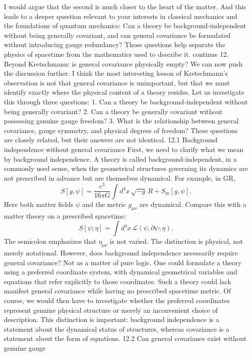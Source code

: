 I would argue that the second is much closer to the heart of the matter. And
this leads to a deeper question relevant to your interests in classical
mechanics and the foundations of quantum mechanics: Can a theory be
background-independent without being generally covariant, and can general
covariance be formulated without introducing gauge redundancy? Those questions
help separate the physics of spacetime from the mathematics used to describe
it. continue 12. Beyond Kretschmann: is general covariance physically empty? We
can now push the discussion further. I think the most interesting lesson of
Kretschmann's observation is not that general covariance is unimportant, but
that we must identify exactly where the physical content of a theory resides.
Let us investigate this through three questions: 1. Can a theory be
background-independent without being generally covariant? 2. Can a theory be
generally covariant without possessing genuine gauge freedom? 3. What is the
relationship between general covariance, gauge symmetry, and physical degrees
of freedom? These questions are closely related, but their answers are not
identical. 12.1 Background independence without general covariance First, we
need to clarify what we mean by background independence. A theory is called
background-independent, in a commonly used sense, when the geometrical
structures governing its dynamics are not prescribed in advance but are
themselves dynamical. For example, in GR, \[ S[g,\psi]= \frac{c^3}{16\pi G}
\int d^4x\,\sqrt{-g}\,R +S_{\mathrm m}[g,\psi]. \] Here both matter fields
\(\psi\) and the metric \(g_{\mu\nu}\) are dynamical. Compare this with a
matter theory on a prescribed spacetime: \[ S[\psi;\eta]= \int d^4x\,\mathcal
L(\psi,\partial\psi;\eta). \] The semicolon emphasizes that \(\eta_{\mu\nu}\)
is not varied. The distinction is physical, not merely notational. However,
does background independence necessarily require general covariance? Not as a
matter of pure logic. One could formulate a theory using a preferred coordinate
system, with dynamical geometrical variables and equations that refer
explicitly to those coordinates. Such a theory could lack manifest general
covariance while having no prescribed spacetime metric. Of course, we would
then have to investigate whether the preferred coordinates represent genuine
physical structure or merely an inconvenient choice of description. This
distinction is important: background independence is a statement about the
dynamical status of structures, whereas covariance is a statement about the
form of equations. 12.2 Can general covariance exist without genuine gauge
